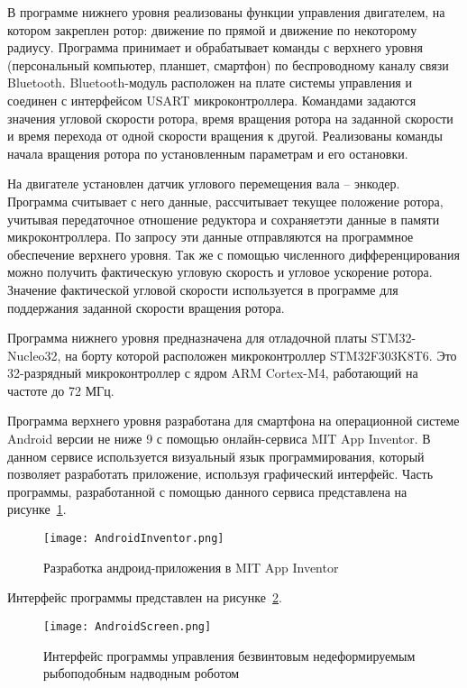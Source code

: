 В программе нижнего уровня реализованы функции управления двигателем, на котором закреплен ротор: движение по прямой и движение по некоторому радиусу. Программа принимает и обрабатывает команды с верхнего уровня (персональный компьютер, планшет, смартфон) по беспроводному каналу связи Bluetooth. Bluetooth-модуль расположен на плате системы управления и соединен с интерфейсом USART микроконтроллера. Командами задаются значения угловой скорости ротора, время вращения ротора на заданной скорости и время перехода от одной скорости вращения к другой. Реализованы команды начала вращения ротора по установленным параметрам и его остановки.

На двигателе установлен датчик углового перемещения вала – энкодер. Программа считывает с него данные, рассчитывает текущее положение ротора, учитывая передаточное отношение редуктора и сохраняетэти данные в памяти микроконтроллера. По запросу эти данные отправляются на программное обеспечение верхнего уровня. Так же с помощью численного дифференцирования можно получить фактическую угловую скорость и угловое ускорение ротора. Значение фактической угловой скорости используется в программе для поддержания заданной скорости вращения ротора.

Программа нижнего уровня предназначена для отладочной платы STM32-Nucleo32, на борту которой расположен микроконтроллер STM32F303K8T6. Это 32-разрядный микроконтроллер с ядром ARM Cortex-M4, работающий на частоте до 72 МГц.

Программа верхнего уровня разработана для смартфона на операционной системе Android версии не ниже 9 с помощью онлайн-сервиса MIT App Inventor. В данном сервисе используется визуальный язык программирования, который позволяет разработать приложение, используя графический интерфейс. Часть программы, разработанной с помощью данного сервиса представлена на рисунке~\ref{AndroidInventor}.

\begin{figure}[!h]
	\centering
	\texttt{[image: AndroidInventor.png]}
	\caption{Разработка андроид-приложения в MIT App Inventor}
	\label{AndroidInventor}
\end{figure}

Интерфейс программы представлен на рисунке~\ref{AndroidScreen}.

\begin{figure}[!h]
	\centering
	\texttt{[image: AndroidScreen.png]}
	\caption{Интерфейс программы управления безвинтовым недеформируемым рыбоподобным надводным роботом}
	\label{AndroidScreen}
\end{figure}

